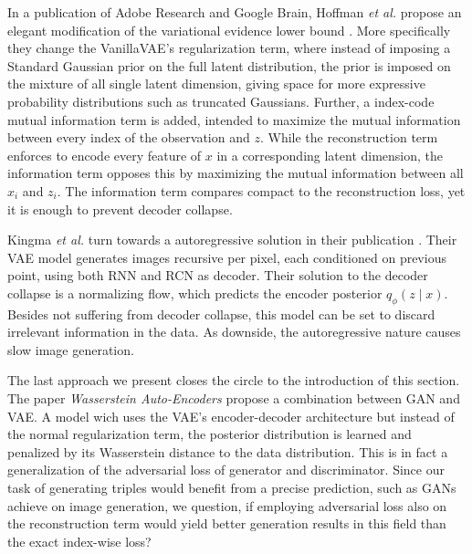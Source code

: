 In a publication of Adobe Research and Google Brain, Hoffman \textit{et al.} propose an elegant modification of the variational evidence lower bound \cite{hoffman2016elbo}. 
More specifically they change the VanillaVAE's regularization term, where instead of imposing a Standard Gaussian prior on the full latent distribution, the prior is imposed on the mixture of all single latent dimension, giving space for more expressive probability distributions such as truncated Gaussians. 
Further, a index-code mutual information term is added, intended to maximize the mutual information between every index of the observation and $z$. While the reconstruction term enforces to encode every feature of $x$ in a corresponding latent dimension, the  information term opposes this by maximizing the mutual information between all  $x_i$ and $z_i$. The information term compares compact to the reconstruction loss, yet it is enough to prevent decoder collapse. 


Kingma \textit{et al.} turn towards a autoregressive solution in their publication \cite{chen_variational_2017}. Their VAE model generates images recursive per pixel, each conditioned on previous point, using both RNN and RCN as decoder. Their solution to the decoder collapse is a normalizing flow, which predicts the encoder posterior $q_{\phi}(z \mid x)$. Besides not suffering from decoder collapse, this model can be set to discard irrelevant information in the data. As downside, the autoregressive nature causes slow image generation.


The last approach we present closes the circle to the introduction of this section. The paper \textit{Wasserstein Auto-Encoders} \cite{tolstikhin_wasserstein_2019} propose a combination between GAN and VAE. A model wich uses the VAE's encoder-decoder architecture but instead of the normal regularization term, the posterior distribution is learned and penalized by its Wasserstein distance to the data distribution. This is in fact a generalization of the adversarial loss of generator and discriminator. Since our task of generating triples would benefit from a precise prediction, such as GANs achieve on image generation, we question, if employing adversarial loss also on the reconstruction term would yield better generation results in this field than the exact index-wise loss?



